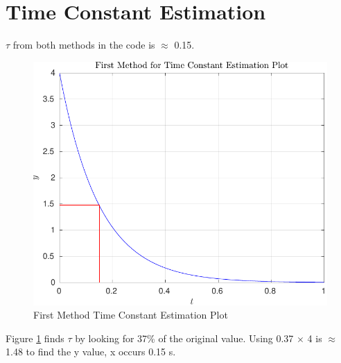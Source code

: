 \documentclass[12pt]{article}
\begin{document}
	\section{Time Constant Estimation}
			
			$\tau$  from both methods in the code is $\approx$ 0.15.
		\begin{figure}[H]
			\centering
			\includegraphics[width=1\linewidth]{"Code/Fig/first_method_time_constant_plot_line.pdf"}
			\caption{First Method Time Constant Estimation Plot}
			\label{fig:first_method_time_constant_plot}
		\end{figure}
	  	Figure \ref{fig:first_method_time_constant_plot} finds $\tau$ by looking for 37\% of the original value. Using 0.37 $\times$ 4 is $\approx$ 1.48 to find the y value, x occurs 0.15 s.
\end{document}
